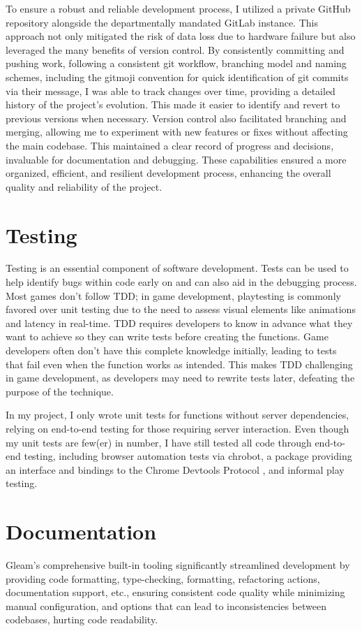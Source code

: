 \documentclass[]{final}
\begin{document}
To ensure a robust and reliable development process, I utilized a private GitHub repository
alongside the departmentally mandated GitLab instance. This approach not only mitigated
the risk of data loss due to hardware failure but also leveraged the many benefits of
version control. By consistently committing and pushing work, following a consistent
git workflow, branching model and naming schemes, including the gitmoji convention
for quick identification of git commits via their message, I was able to track changes
over time, providing a detailed history of the project's evolution. This made
it easier to identify and revert to previous versions when necessary. Version
control also facilitated branching and merging, allowing me to experiment with
new features or fixes without affecting the main codebase. This maintained a
clear record of progress and decisions, invaluable for documentation and debugging.
These capabilities ensured a more organized, efficient, and resilient development
process, enhancing the overall quality and reliability of the project.

\section{Testing}
Testing is an essential component of software development. Tests can be used to
help identify bugs within code early on and can also aid in the debugging process.
Most games don't follow TDD; in game development, playtesting is commonly favored
over unit testing due to the need to assess visual elements like animations and
latency in real-time.\cite{politowski_survey_2021} TDD requires developers to know
in advance what they want to
achieve so they can write tests before creating the functions. Game developers often don't
have this complete knowledge initially, leading to tests that fail even when the function
works as intended. This makes TDD challenging in game development, as developers may
need to rewrite tests later, defeating the purpose of the technique.

In my project, I only wrote unit tests for functions without server
dependencies, relying on end-to-end testing for those requiring server interaction.
Even though my unit tests are few(er) in number, I have still tested all code through
end-to-end testing, including browser automation tests via chrobot, a package providing
an interface and bindings to the Chrome Devtools Protocol \cite{noauthor_chrobot_nodate},
and informal play testing.

\section{Documentation}
Gleam's comprehensive built-in tooling significantly streamlined development by
providing code formatting, type-checking, formatting, refactoring actions, documentation support, etc.,
ensuring consistent code quality while minimizing manual configuration, and
options that can lead to inconsistencies between codebases, hurting code
readability.
\end{document}
